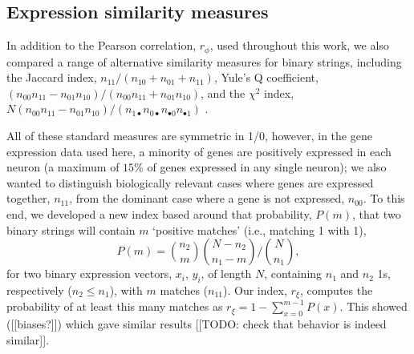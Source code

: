 \documentclass[10pt,letterpaper]{article}
\begin{document}
\subsection*{Expression similarity measures}

In addition to the Pearson correlation, $r_\phi$, used throughout this work, we also compared a range of alternative similarity measures for binary strings, including the
Jaccard index, $n_{11}/(n_{10}+n_{01}+n_{11})$,
Yule's Q coefficient, $(n_{00}n_{11} - n_{01}n_{10})/(n_{00}n_{11} + n_{01}n_{10})$,
and the $\chi^2$ index, $N (n_{00}n_{11} - n_{01}n_{10})/(n_{1\bullet}n_{0\bullet}n_{\bullet 0}n_{\bullet 1})$ \cite{Kaufman2006}.

All of these standard measures are symmetric in 1/0, however, in the gene expression data used here, a minority of genes are positively expressed in each neuron (a maximum of $15\%$ of genes expressed in any single neuron); we also wanted to distinguish biologically relevant cases where genes are expressed together, $n_{11}$, from the dominant case where a gene is not expressed, $n_{00}$.
To this end, we developed a new index based around that probability, $P(m)$, that two binary strings will contain $m$ `positive matches' (i.e., matching 1 with 1),
\begin{equation}
    P(m) = \binom{n_2}{m} \binom{N-n_2}{n_1-m} / \binom{N}{n_1},
\end{equation}
for two binary expression vectors, $x_i$, $y_i$, of length $N$, containing $n_1$ and $n_2$ 1s, respectively ($n_2 \leq n_1$), with $m$ matches ($n_{11}$).
Our index, $r_\xi$, computes the probability of at least this many matches as $r_\xi = 1 - \sum_{x=0}^{m-1} P(x)$.
This showed ([[biases?]]) which gave similar results [[TODO: check that behavior is indeed similar]].
\end{document}
